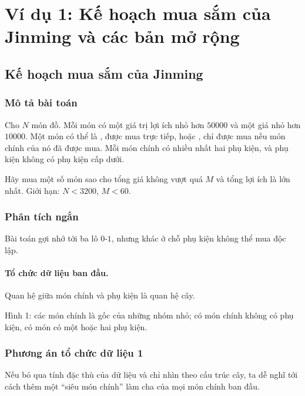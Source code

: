 \documentclass[11pt]{article}
\begin{document}
\section{Ví dụ 1: Kế hoạch mua sắm của Jinming và các bản mở rộng}

\subsection{Kế hoạch mua sắm của Jinming}

\subsubsection*{Mô tả bài toán}

Cho \(N\) món đồ. Mỗi món có một giá trị lợi ích nhỏ hơn \(50000\) và một giá
nhỏ hơn \(10000\). Một món có thể là , được mua trực tiếp, hoặc
, chỉ được mua nếu món chính của nó đã được mua. Mỗi món chính
có nhiều nhất hai phụ kiện, và phụ kiện không có phụ kiện cấp dưới.

Hãy mua một số món sao cho tổng giá không vượt quá \(M\) và tổng lợi ích là
lớn nhất. Giới hạn: \(N<3200\), \(M<60\).

\subsubsection*{Phân tích ngắn}

Bài toán gợi nhớ tới ba lô \(0\)-\(1\), nhưng khác ở chỗ phụ kiện không thể
mua độc lập.

\paragraph{Tổ chức dữ liệu ban đầu.}
Quan hệ giữa món chính và phụ kiện là quan hệ cây.

\begin{center}
  \small Hình 1: các món chính là gốc của những nhóm nhỏ; có món chính không
  có phụ kiện, có món có một hoặc hai phụ kiện.
\end{center}

\subsubsection*{Phương án tổ chức dữ liệu 1}

Nếu bỏ qua tính đặc thù của dữ liệu và chỉ nhìn theo cấu trúc cây, ta dễ nghĩ
tới cách thêm một ``siêu món chính'' làm cha của mọi món chính ban đầu.
\end{document}
